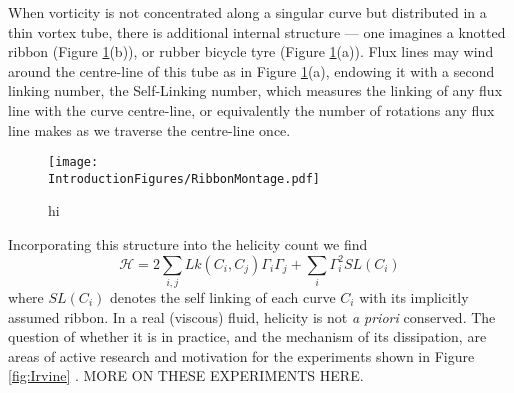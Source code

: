 When vorticity is not concentrated along a singular curve but distributed in a thin vortex tube, there is additional internal structure --- one imagines a knotted ribbon (Figure \ref{fig:RibbonMontage}(b)), or rubber bicycle tyre (Figure \ref{fig:RibbonMontage}(a)). Flux lines may wind around the centre-line of this tube as in Figure \ref{fig:RibbonMontage}(a), endowing it with a second linking number, the Self-Linking number, which measures the linking of any flux line with the curve centre-line, or equivalently the number of rotations any flux line makes as we traverse the centre-line once. 
\begin{figure}[htbp]
\centering
\texttt{[image: \\IntroductionFigures/RibbonMontage.pdf]}
\caption{hi }
\label{fig:RibbonMontage}
\end{figure}
Incorporating this structure into the helicity count we find \cite{MoffatRicca}
\begin{equation}
    \mathcal{H} = 2\sum_{i,j} Lk(C_i,C_j) \Gamma_i \Gamma_j + \sum_{i} \Gamma_i^2 SL(C_i) 
    \label{eq:HelicityCount}
\end{equation}
where $SL(C_i)$ denotes the self linking of each curve $C_i$ with its implicitly assumed ribbon. In a real (viscous) fluid, helicity is not \emph{a priori} conserved. The question of whether it is in practice, and the mechanism of its dissipation, are areas of active research and motivation for the experiments shown in Figure \ref{fig:Irvine} \cite{Klecker}. 
MORE ON THESE EXPERIMENTS HERE.

